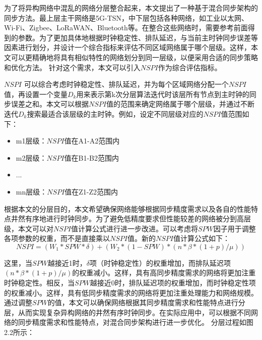 \documentclass[UTF8,a4paper,12pt]{ctexart}
\numberwithin{equation}{section}
\begin{document}
	为了将异构网络中混乱的网络分层整合起来，本文提出了一种基于混合同步架构的同步方法。最上层主干网络是5G-TSN，中下层包括各种网络，如工业以太网、Wi-Fi、Zigbee、LoRaWAN、Bluetooth等。在整合这些网络时，需要参考前面得到的参数。为了更加具体地根据时钟稳定性、排队延迟，与当前主时钟同步误差等因素进行划分，并设计一个综合指标来评估不同区域网络属于哪个层级。这样，本文可以更精确地将具有相似特性的网络划分到同一层级，以便采用合适的同步策略和优化方法。
	针对这个需求，本文可以引入$NSPI$作为综合评估指标。
	
	$NSPI$ 可以综合考虑时钟稳定性、排队延迟，并为每个区域网络分配一个$NSPI$值，再设置一个变量$D_k$用来表示第k次分层算法迭代时该层所有节点到主时钟的同步误差之和。本文可以根据$NSPI$值的范围来确定网络属于哪个层级，并通过不断迭代$D_k$搜索最适合该层级的主时钟。例如，设定不同层级对应的$NSPI$值范围如下：
	\begin{itemize}
		\item m1层级：$NSPI$值在A1-A2范围内
		\item m2层级：$NSPI$值在B1-B2范围内
		\item ...
		\item mn层级：$NSPI$值在Z1-Z2范围内
	\end{itemize}
	
	根据本文的分层目的，本文希望确保网络能够根据同步精度需求以及各自的性能特点井然有序地进行时钟同步。为了避免低精度要求但性能较差的网络被分到高层级，本文可以对$NSPI$值计算公式进行进一步改进。可以考虑将$SPW$因子用于调整各项参数的权重，而不是直接乘以$NSPI$值。新的$NSPI$值计算公式如下：
	\begin{equation}
		NSPI = (W_1 * SPW * \delta) + (W_2 * (1 - SPW) * (n * \beta * (1 + p) / \mu)) 
	\end{equation}
	
	这里，当$SPW$越接近1时，$\delta$项（时钟稳定性）的权重增加，而排队延迟项$(n * \beta * (1 + p) / \mu)$的权重减小。这样，具有高同步精度需求的网络将更加注重时钟稳定性。相反，当$SPW$越接近0时，排队延迟项的权重增加，而时钟稳定性项的权重减小。这样，具有低同步精度需求的网络将更加注重处理能力和网络规模。
	通过调整$SPW$的值，本文可以确保网络根据其同步精度需求和性能特点进行分层，从而实现复杂异构网络的井然有序时钟同步。在实际应用中，可以根据不同网络的同步精度需求和性能特点，对混合同步架构进行进一步优化。
	分层过程如图2.2所示：
	
\end{document}
